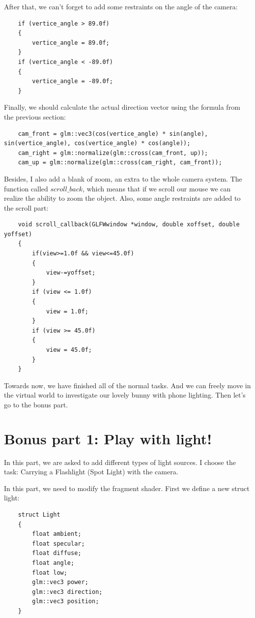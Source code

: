 \documentclass[acmtog]{acmart}
\begin{document}
After that, we can't forget to add some restraints on the angle of the camera:

\begin{lstlisting}
	if (vertice_angle > 89.0f)
  	{
    	vertice_angle = 89.0f;
  	}
  	if (vertice_angle < -89.0f)
  	{
    	vertice_angle = -89.0f;
  	}
\end{lstlisting}

Finally, we should calculate the actual direction vector using the formula from the previous section:

\begin{lstlisting}
	cam_front = glm::vec3(cos(vertice_angle) * sin(angle), sin(vertice_angle), cos(vertice_angle) * cos(angle));
  	cam_right = glm::normalize(glm::cross(cam_front, up));
  	cam_up = glm::normalize(glm::cross(cam_right, cam_front));
\end{lstlisting}

Besides, I also add a blank of zoom, an extra to the whole camera system. The function called $scroll\_back$, which means that if we scroll our mouse we can realize the ability to zoom the object. Also, some angle restraints are added to the scroll part:

\begin{lstlisting}
	void scroll_callback(GLFWwindow *window, double xoffset, double yoffset)
	{
  		if(view>=1.0f && view<=45.0f)
  		{
    		view-=yoffset;
  		}
  		if (view <= 1.0f)
  		{
    		view = 1.0f;
  		}
  		if (view >= 45.0f)
  		{
    		view = 45.0f;
  		}
	}
\end{lstlisting}

Towards now, we have finished all of the normal tasks. And we can freely move in the virtual world to investigate our lovely bunny with phone lighting. Then let's go to the bonus part.

\section{Bonus part 1: Play with light!}

In this part, we are asked to add different types of light sources. I choose the task: Carrying a Flashlight (Spot Light) with the camera.

In this part, we need to modify the fragment shader. First we define a new struct light:

\begin{lstlisting}
	struct Light
	{
  		float ambient;
  		float specular;
  		float diffuse;
  		float angle;
  		float low;
  		glm::vec3 power;
  		glm::vec3 direction;
  		glm::vec3 position;
	}
\end{lstlisting}
\end{document}
